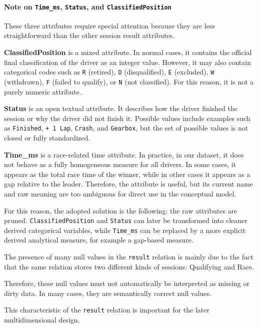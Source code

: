 \documentclass[a4paper,11pt]{article}
\begin{document}
	\paragraph*{Note on \texttt{Time\_ms}, \texttt{Status}, and \texttt{ClassifiedPosition}}
	
	These three attributes require special attention because they are less straightforward than the other session result attributes.
	
	\textbf{ClassifiedPosition} is a mixed attribute. In normal cases, it contains the official final classification of the driver as an integer value. However, it may also contain categorical codes such as \texttt{R} (retired), \texttt{D} (disqualified), \texttt{E} (excluded), \texttt{W} (withdrawn), \texttt{F} (failed to qualify), or \texttt{N} (not classified). For this reason, it is not a purely numeric attribute.
	
	\textbf{Status} is an open textual attribute. It describes how the driver finished the session or why the driver did not finish it. Possible values include examples such as \texttt{Finished}, \texttt{+ 1 Lap}, \texttt{Crash}, and \texttt{Gearbox}, but the set of possible values is not closed or fully standardized.
	
	\textbf{Time\_ms} is a race-related time attribute. In practice, in our dataset, it does not behave as a fully homogeneous measure for all drivers. In some cases, it appears as the total race time of the winner, while in other cases it appears as a gap relative to the leader. Therefore, the attribute is useful, but its current name and raw meaning are too ambiguous for direct use in the conceptual model.
	
	For this reason, the adopted solution is the following: the raw attributes are pruned. \texttt{ClassifiedPosition} and \texttt{Status} can later be transformed into cleaner derived categorical variables, while \texttt{Time\_ms} can be replaced by a more explicit derived analytical measure, for example a gap-based measure.
	
	
	The presence of many null values in the \texttt{result} relation is mainly due to the fact
	that the same relation stores two different kinds of sessions: Qualifying and Race.
	

	Therefore, these null values must not automatically be interpreted as missing or dirty
	data. In many cases, they are semantically correct null values.
	
	This characteristic of the \texttt{result} relation is important for the later
	multidimensional design.
	
\end{document}
